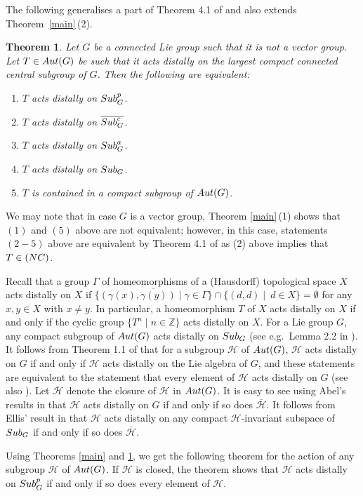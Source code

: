 \documentclass{amsart}
\numberwithin{equation}{section}
\newcommand{\Aut}{{\rm Aut}}
\newcommand{\Sub}{{\rm Sub}}
\newcommand{\Z}{{\mathbb Z}}
\newcommand{\Hc}{{\mathcal H}}
\newcommand{\spg}{{\rm Sub}^p_G}
\let\ol=\overline
\newtheorem{thm}{Theorem}[section]
\theoremstyle{remark}
\begin{document}
 The following generalises a part of Theorem 4.1 of \cite{SY3} and also extends Theorem~\ref{main}\,(2).

\begin{thm} \label{general} Let $G$ be a connected Lie group such that it is not a vector group. Let 
$T\in\Aut(G)$ be such that it acts distally on the largest compact connected central subgroup of $G$. 
Then the following are equivalent:
\begin{enumerate}
\item $T$ acts distally on $\spg$.
\item $T$ acts distally on $\ol{\Sub^c_G}$. 
\item $T$ acts distally on $\Sub^a_G$. 
\item $T$ acts distally on $\Sub_G$. 
\item $T$ is contained in a compact subgroup of $\Aut(G)$. 
\end{enumerate}
\end{thm}

We may note that in case $G$ is a vector group, Theorem \ref{main}\,(1) shows that $(1)$ and $(5)$ above are not equivalent;
however, in this case, statements $(2-5)$ above are equivalent by Theorem 4.1 of \cite{SY3} as (2) above implies that 
$T\in ({\rm NC})$.

Recall that a group $\Gamma$ of homeomorphisms of a (Hausdorff) topological space $X$ acts distally on $X$ if 
$\ol{\{(\gamma(x),\gamma(y))\mid \gamma\in\Gamma\}}\cap \{(d,d)\mid\ d\in X\}=\emptyset$ for any $x,y\in X$ with $x\ne y$. 
In particular, a homeomorphism $T$ of $X$ acts distally on $X$ if and only if the cyclic group $\{T^n\mid n\in\Z\}$ acts distally on 
$X$. For a Lie group $G$, any compact subgroup of $\Aut(G)$ acts distally on $\Sub_G$ (see e.g.\ Lemma 2.2 in \cite{SY2}). 
It follows from Theorem 1.1 of \cite{Ab2} that for a subgroup $\Hc$ of $\Aut(G)$, 
$\Hc$ acts distally on $G$ if and only if $\Hc$ acts distally on the Lie algebra of $G$, 
and these statements are equivalent to the statement that every element of $\Hc$ acts distally on $G$ (see also \cite{CG}). 
Let $\ol{\Hc}$ denote the closure of $\Hc$ in $\Aut(G)$. It is easy to see using Abel's results in \cite{Ab1, Ab2} that 
$\Hc$ acts distally on $G$ if and only if so does $\ol{\Hc}$. It follows from Ellis' result in \cite{E} that 
$\Hc$ acts distally on any compact $\Hc$-invariant subspace of $\Sub_G$ if and only if so does $\ol{\Hc}$. 

 Using Theorems \ref{main} and 
\ref{general}, we get the following theorem for the action of any subgroup $\Hc$ of $\Aut(G)$. If $\Hc$ is closed, 
the theorem shows that $\Hc$ acts distally on $\spg$ if and only if so does every element of $\Hc$. 
\end{document}
